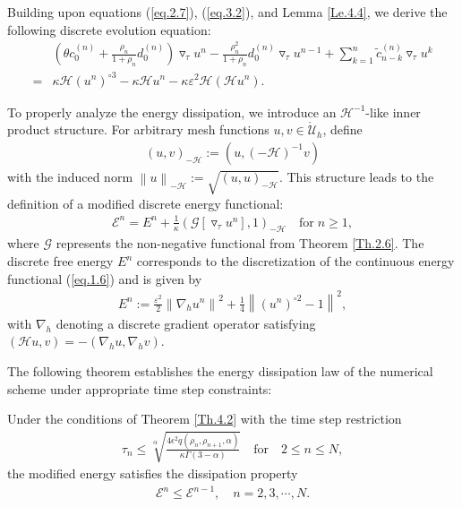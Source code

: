\documentclass{siamart171218}
\theoremstyle{remark}
\theoremstyle{example}
\numberwithin{equation}{section}
\begin{document}
Building upon equations (\ref{eq.2.7}), (\ref{eq.3.2}), and Lemma \ref{Le.4.4}, we derive the following discrete evolution equation:
\begin{equation}\label{eq.4.1}
\begin{aligned}
&\left( \theta c_{0}^{(n)}+ \frac{\rho_{n}}{1+\rho_{n}}d_{0}^{(n)} \right) \triangledown_\tau u^{n}
-\frac{\rho_{n}^2}{1+\rho_{n}}d_{0}^{(n)} \triangledown_\tau u^{n-1} + \sum\limits_{k=1}^{n} \widetilde{c}_{n-k}^{(n)}\triangledown_\tau u^{k} \\
= &\kappa \mathcal{H} \left(u^{n} \right)^{\circ 3}-\kappa \mathcal{H} u^{n} - \kappa \varepsilon^2 \mathcal{H}\left(\mathcal{H} u^n\right).
\end{aligned}
\end{equation}

To properly analyze the energy dissipation, we introduce an $\mathcal{H}^{-1}$-like inner product structure. For arbitrary mesh functions $u,v \in \mathring{\mathcal{U}}_h$, define
\begin{align*}
(u,v)_{-\mathcal{H}} := \left(u,\left(-\mathcal{H}\right)^{-1} v \right)
\end{align*}
with the induced norm $\left\|u\right\|_{-\mathcal{H}} :=
\sqrt{\left(u,u\right)_{-\mathcal{H}}}$. This structure leads to the definition of a modified discrete energy functional:
\begin{align}\label{eq.4.2}
\mathcal{E}^n = E^n + \frac{1}{\kappa}\left(\mathcal{G}\left
[\triangledown_\tau u^n\right],1\right)_{-\mathcal{H}} \quad \text{for} \; n \ge 1,
\end{align}
where $\mathcal{G}$ represents the non-negative functional from Theorem \ref{Th.2.6}. The discrete free energy $E^n$ corresponds to the discretization of the continuous energy functional (\ref{eq.1.6}) and is given by
\begin{align*}
E^n := \frac{\varepsilon^2}{2} \left\| \nabla_h u^{n} \right\|^2
 + \frac{1}{4} \left\| \left(u^{n}\right)^{\circ 2}-1 \right\|^2,
\end{align*}
with $\nabla_h$ denoting a discrete gradient operator satisfying $(\mathcal{H} u,v) = -(\nabla_h u,\nabla_h v)$.

The following theorem establishes the energy dissipation law of the numerical scheme under appropriate time step constraints:

\begin{theorem}\label{Th.4.5}
Under the conditions of Theorem \ref{Th.4.2} with the time step restriction
\begin{align*}
\tau_n \leq \sqrt[\alpha]{\frac{4\epsilon^2 q(\rho_n,\rho_{n+1},\alpha)}{\kappa\Gamma(3-\alpha)}} \quad \text{for} \quad 2 \leq n \leq N,
\end{align*}
the modified energy satisfies the dissipation property
\begin{align*}
\mathcal{E}^n \leq \mathcal{E}^{n-1}, \quad n=2,3,\cdots,N.
\end{align*}
\end{theorem}
\end{document}
